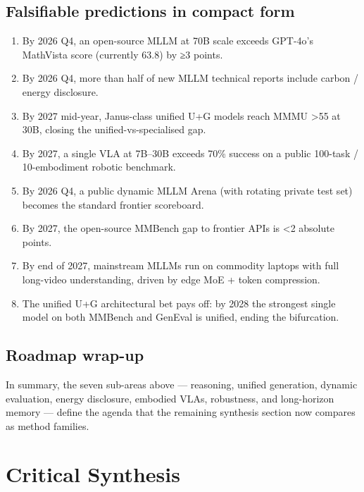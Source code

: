 \documentclass{article}
\begin{document}
\subsection{Falsifiable predictions in compact form}\label{falsifiable-predictions-in-compact-form}

\begin{enumerate}
\def\labelenumi{\arabic{enumi}.}

\item
  By 2026 Q4, an open-source MLLM at 70B scale exceeds GPT-4o's MathVista score (currently 63.8) by ≥3 points.
\item
  By 2026 Q4, more than half of new MLLM technical reports include carbon / energy disclosure.
\item
  By 2027 mid-year, Janus-class unified U+G models reach MMMU \textgreater55 at 30B, closing the unified-vs-specialised gap.
\item
  By 2027, a single VLA at 7B--30B exceeds 70\% success on a public 100-task / 10-embodiment robotic benchmark.
\item
  By 2026 Q4, a public dynamic MLLM Arena (with rotating private test set) becomes the standard frontier scoreboard.
\item
  By 2027, the open-source MMBench gap to frontier APIs is \textless2 absolute points.
\item
  By end of 2027, mainstream MLLMs run on commodity laptops with full long-video understanding, driven by edge MoE + token compression.
\item
  The unified U+G architectural bet pays off: by 2028 the strongest single model on both MMBench and GenEval is unified, ending the bifurcation.
\end{enumerate}

\subsection{Roadmap wrap-up}\label{roadmap-wrap-up}

In summary, the seven sub-areas above --- reasoning, unified generation, dynamic evaluation, energy disclosure, embodied VLAs, robustness, and long-horizon memory --- define the agenda that the remaining synthesis section now compares as method families.

\section{Critical Synthesis}\label{critical-synthesis}
\end{document}
